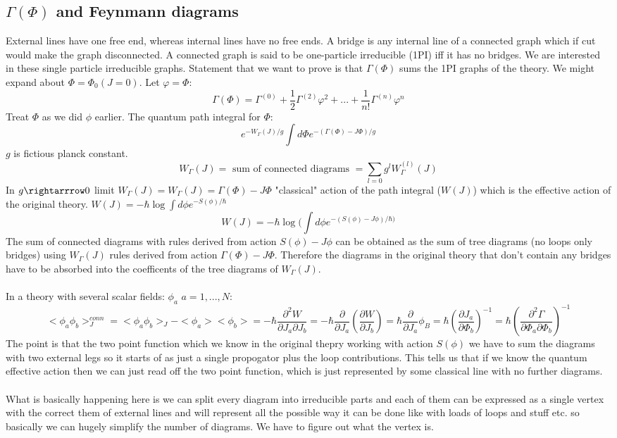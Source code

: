 \documentclass{article}
\begin{document}
\subsection{$\Gamma(\Phi)$ and Feynmann diagrams}
External lines have one free end, whereas internal lines have no free ends. A bridge is any internal line of a connected graph which if cut would make the graph disconnected. A connected graph is said to be one-particle irreducible (1PI) iff it has no bridges. We are interested in these single particle irreducible graphs. Statement that we want to prove is that $\Gamma(\Phi)$ sums the 1PI graphs of the theory. We might expand about $\Phi = \Phi_0 (J = 0)$. Let $\varphi = \Phi$:
$$
\Gamma(\Phi) = \Gamma^{(0)} + \frac{1}{2} \Gamma^{(2)} \varphi^2 + ... + \frac{1}{n!} \Gamma^{(n)} \varphi^n
$$
Treat $\Phi$ as we did $\phi$ earlier. The quantum path integral for $\Phi$:
$$
e^{-W_{\Gamma}(J)/g}\int d\Phi e^{- (\Gamma(\Phi) - J \Phi)/g}
$$
$g$ is fictious planck constant.
$$
W_{\Gamma}(J) = \text{ sum of connected diagrams } =  \sum_{l=0} g^l W_{\Gamma}^{(l)}(J)
$$
In $g \rightarrrow 0$ limit $W_{\Gamma}(J) = W_{\Gamma}(J) = \Gamma(\Phi) - J \Phi$ "classical" action of the path integral ($W(J)$) which is the effective action of the original theory. $W(J) = -\hbar \log \int d \phi e^{- S(\phi)/\hbar}$
$$
W(J) = - \hbar \log (\int d\phi e^{-(S(\phi) - J\phi)/\hbar)}
$$
The sum of connected diagrams with rules derived from action $S(\phi) - J\phi$ can be obtained as the sum of tree diagrams (no loops only bridges) using $W_{\Gamma}(J)$ rules derived from action $\Gamma(\Phi) - J\Phi$. Therefore the diagrams in the original theory that don't contain any bridges have to be absorbed into the coefficents of the tree diagrams of $W_{\Gamma}(J)$.\\\\
In a theory with several scalar fields: $\phi_a$ $a = 1,..., N$:
$$
<\phi_a \phi_b>_J^{conn} = < \phi_a \phi_b>_J - <\phi_a> <\phi_b> = - \hbar \frac{\partial^2 W}{\partial J_a \partial J_b} = - \hbar \frac{\partial}{\partial J_a}( \frac{\partial W}{\partial J_b}) = \hbar \frac{\partial}{\partial J_a} \phi_B = \hbar (\frac{\partial J_a}{\partial \Phi_b})^{-1} = \hbar (\frac{\partial^2 \Gamma}{\partial \Phi_a \partial \Phi_b})^{-1}
$$
The point is that the two point function which we know in the original thepry working with action $S(\phi)$ we have to sum the diagrams with two external legs so it starts of as just a single propogator plus the loop contributions. This tells us that if we know the quantum effective action then we can just read off the two point function, which is just represented by some classical line with no further diagrams.\\\\
What is basically happening here is we can split every diagram into irreducible parts and each of them can be expressed as a single vertex with the correct them of external lines and will represent all the possible way it can be done like with loads of loops and stuff etc. so basically we can hugely simplify the number of diagrams. We have to figure out what the vertex is.
\end{document}
